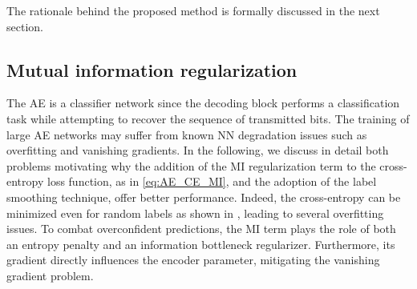 The rationale behind the proposed method is formally discussed in the next section.

\subsection{Mutual information regularization}
\label{sec:autoencoders_MI_reg}
The AE is a classifier network since the decoding block performs a classification task while attempting to recover the sequence of transmitted bits. The training of large AE networks may suffer from known NN degradation issues such as overfitting and vanishing gradients. In the following, we discuss in detail both problems motivating why the addition of the MI regularization term to the cross-entropy loss function, as in \eqref{eq:AE_CE_MI}, and the adoption of the label smoothing technique, offer better performance. Indeed, the cross-entropy can be minimized even for random labels as shown in \cite{Zhang2017}, leading to several overfitting issues. 
To combat overconfident predictions, the MI term plays the role of both an entropy penalty and an information bottleneck regularizer. Furthermore, its gradient directly influences the encoder parameter, mitigating the vanishing gradient problem.
  
